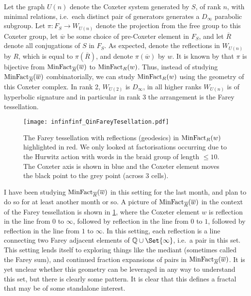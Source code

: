 Let the graph $U(n)$ denote the Coxeter system generated by $S$, of rank $n$, with minimal relations, i.e.~each distinct pair of generators generates a  $D_\infty$ parabolic subgroup.
Let $\pi \colon F_S \to W_{U(n)}$ denote the projection from the free group to this Coxeter group, let $\overline{w}$ be some choice of pre-Coxeter element in  $F_S$, and let $\overline{R}$ denote all conjugations of $S$ in $F_S$.
As expected, denote the reflections in $W_{U(n)}$ by $R$, which is equal to $\pi(\overline{R})$, and denote $\pi(\overline{w})$ by $w$.
It is known by \cite[Corollary 4.6]{bessis_dual_2006} that $\pi$ is bijective from $\operatorname{MinFact}_{\overline{R}}(\overline{w})$ to $\operatorname{MinFact}_R(w)$.
Thus, instead of studying $\operatorname{MinFact}_{\overline{R}}(\overline{w})$ combinatorially, we can study  $\operatorname{MinFact}_R(w)$ using the geometry of this Coxeter complex.
In rank 2,  $W_{U(2)}$ is  $D_\infty$, in all higher ranks  $W_{U(n)}$ is of hyperbolic signature and in particular in rank 3 the arrangement is the Farey tessellation.

\begin{figure}[ht]
	\centering
	\texttt{[image: infinfinf\_QinFareyTesellation.pdf]}
	\caption{The Farey tessellation with reflections (geodesics) in $\operatorname{MinFact}_R(w)$ highlighted in red.
		We only looked at factorisations occurring due to the Hurwitz action with words in the braid group of length  $\leq 10$.
		The Coxeter axis is shown in blue and the Coxeter element moves the black point to the grey point (across 3 cells).}
	\label{fig:Q_in_farey_tesellation}
\end{figure}

I have been studying $\operatorname{MinFact}_{\overline{R}}(\overline{w})$ in this setting for the last month, and plan to do so for at least another month or so.
A picture of $\operatorname{MinFact}_{\overline{R}}(\overline{w})$ in the context of the Farey tessellation is shown in \cref{fig:Q_in_farey_tesellation}, where the Coxeter element $w$ is reflection in the line from  0 to $\infty$, followed by reflection in the line from  $0$ to  $1$, followed by reflection in the line from  $1$ to $\infty$.
In this setting, each reflection is a line connecting two Farey adjacent elements of $\Q \cup \Set{\infty}$, i.e.~a pair in this set.
This setting lends itself to exploring things like the mediant (sometimes called the Farey sum), and continued fraction expansions of pairs in $\operatorname{MinFact}_{\overline{R}}(\overline{w})$.
It is yet unclear whether this geometry can be leveraged in any way to understand this set, but there is clearly some pattern.
It is clear that this defines a fractal that may be of some standalone interest.

